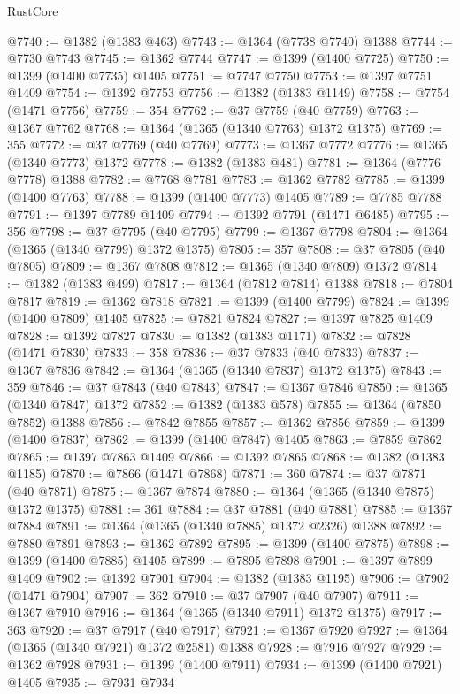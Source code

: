 \begin{lexlean}{RustCore}
\begin{coremodule}
@7740 := @1382 (@1383 @463)
@7743 := @1364 (@7738 @7740) @1388
@7744 := @7730 @7743
@7745 := @1362 @7744
@7747 := @1399 (@1400 @7725)
@7750 := @1399 (@1400 @7735) @1405
@7751 := @7747 @7750
@7753 := @1397 @7751 @1409
@7754 := @1392 @7753
@7756 := @1382 (@1383 @1149)
@7758 := @7754 (@1471 @7756)
@7759 := 354
@7762 := @37 @7759 (@40 @7759)
@7763 := @1367 @7762
@7768 := @1364 (@1365 (@1340 @7763) @1372 @1375)
@7769 := 355
@7772 := @37 @7769 (@40 @7769)
@7773 := @1367 @7772
@7776 := @1365 (@1340 @7773) @1372
@7778 := @1382 (@1383 @481)
@7781 := @1364 (@7776 @7778) @1388
@7782 := @7768 @7781
@7783 := @1362 @7782
@7785 := @1399 (@1400 @7763)
@7788 := @1399 (@1400 @7773) @1405
@7789 := @7785 @7788
@7791 := @1397 @7789 @1409
@7794 := @1392 @7791 (@1471 @6485)
@7795 := 356
@7798 := @37 @7795 (@40 @7795)
@7799 := @1367 @7798
@7804 := @1364 (@1365 (@1340 @7799) @1372 @1375)
@7805 := 357
@7808 := @37 @7805 (@40 @7805)
@7809 := @1367 @7808
@7812 := @1365 (@1340 @7809) @1372
@7814 := @1382 (@1383 @499)
@7817 := @1364 (@7812 @7814) @1388
@7818 := @7804 @7817
@7819 := @1362 @7818
@7821 := @1399 (@1400 @7799)
@7824 := @1399 (@1400 @7809) @1405
@7825 := @7821 @7824
@7827 := @1397 @7825 @1409
@7828 := @1392 @7827
@7830 := @1382 (@1383 @1171)
@7832 := @7828 (@1471 @7830)
@7833 := 358
@7836 := @37 @7833 (@40 @7833)
@7837 := @1367 @7836
@7842 := @1364 (@1365 (@1340 @7837) @1372 @1375)
@7843 := 359
@7846 := @37 @7843 (@40 @7843)
@7847 := @1367 @7846
@7850 := @1365 (@1340 @7847) @1372
@7852 := @1382 (@1383 @578)
@7855 := @1364 (@7850 @7852) @1388
@7856 := @7842 @7855
@7857 := @1362 @7856
@7859 := @1399 (@1400 @7837)
@7862 := @1399 (@1400 @7847) @1405
@7863 := @7859 @7862
@7865 := @1397 @7863 @1409
@7866 := @1392 @7865
@7868 := @1382 (@1383 @1185)
@7870 := @7866 (@1471 @7868)
@7871 := 360
@7874 := @37 @7871 (@40 @7871)
@7875 := @1367 @7874
@7880 := @1364 (@1365 (@1340 @7875) @1372 @1375)
@7881 := 361
@7884 := @37 @7881 (@40 @7881)
@7885 := @1367 @7884
@7891 := @1364 (@1365 (@1340 @7885) @1372 @2326) @1388
@7892 := @7880 @7891
@7893 := @1362 @7892
@7895 := @1399 (@1400 @7875)
@7898 := @1399 (@1400 @7885) @1405
@7899 := @7895 @7898
@7901 := @1397 @7899 @1409
@7902 := @1392 @7901
@7904 := @1382 (@1383 @1195)
@7906 := @7902 (@1471 @7904)
@7907 := 362
@7910 := @37 @7907 (@40 @7907)
@7911 := @1367 @7910
@7916 := @1364 (@1365 (@1340 @7911) @1372 @1375)
@7917 := 363
@7920 := @37 @7917 (@40 @7917)
@7921 := @1367 @7920
@7927 := @1364 (@1365 (@1340 @7921) @1372 @2581) @1388
@7928 := @7916 @7927
@7929 := @1362 @7928
@7931 := @1399 (@1400 @7911)
@7934 := @1399 (@1400 @7921) @1405
@7935 := @7931 @7934

\end{coremodule}
\end{lexlean}
